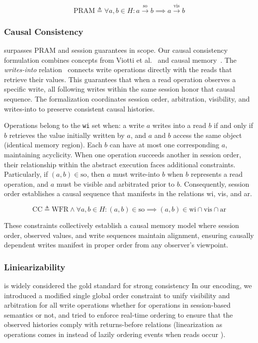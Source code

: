 $$
\text{PRAM} \triangleq \forall a, b \in H: a \xrightarrow{\text{so}}
b \implies a \xrightarrow{\text{vis}} b
$$

\subsubsection{Causal Consistency} surpasses PRAM and
session guarantees in scope. Our causal consistency formulation
combines concepts from Viotti et
al.~\cite{viotti2016consistency}
and causal memory~\cite{baldoni2002an}. The
\textit{writes-into} relation~\cite{baldoni2002an} connects write
operations directly with the reads that retrieve their values. This
guarantees that when
a read operation observes a specific write, all following writes
within the same session
honor that causal sequence. The formalization coordinates session order,
arbitration, visibility, and writes-into to preserve consistent
causal histories.

Operations belong to the \texttt{wi} set when: a write $a$
writes into a read $b$ if and only if $b$ retrieves
the value initially written by $a$, and $a$ and $b$
access the same object (identical memory region). Each $b$ can have at
most one corresponding $a$, maintaining acyclicity.
When one operation succeeds another in session order, their
relationship within the
abstract execution faces additional constraints. Particularly, if $(a, b)
\in \text{so}$,
then $a$ must write-into $b$ when $b$ represents a read operation,
and $a$ must be visible and
arbitrated prior to $b$. Consequently, session order establishes a causal
sequence that manifests
in the relations wi, vis, and ar.

$$
\text{CC} \triangleq \text{WFR} \land \forall a, b \in H: (a, b) \in
\text{so} \implies (a, b) \in \text{wi} \cap \text{vis} \cap \text{ar}
$$

These constraints collectively establish a causal memory model where
session order,
observed values, and write sequences maintain alignment, ensuring
causally dependent writes
manifest in proper order from any observer's viewpoint.

\subsubsection{Liniearizability} is widely considered the gold
standard for strong
consistency In our encoding, we introduced a modified single global
order constraint to unify visibility and
arbitration for all write operations whether for operations in
session-based semantics or not, and tried to enforce real-time ordering to
ensure that the observed histories comply with returns-before relations
(linearization as operations comes in instead of lazily ordering events when
reads occur \cite{zhang2018building}).

